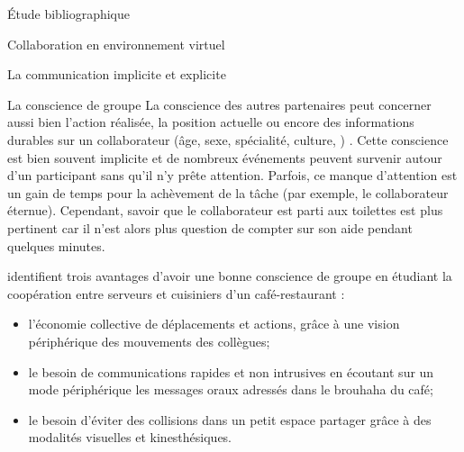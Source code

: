 \documentclass[myfrancais,ngerman,english,frenchb]{mythesis}
\begin{document}
\begin{mychapter}{Étude bibliographique}
\begin{mysection}{Collaboration en environnement virtuel}
\begin{mysubsection}{La communication implicite et explicite}
\begin{mysubsubsection}{La conscience de groupe}
					La conscience des autres partenaires peut concerner aussi bien l'action réalisée, la position actuelle ou encore des informations durables sur un collaborateur (âge, sexe, spécialité, culture, \myetc) .
					Cette conscience est bien souvent implicite et de nombreux événements peuvent survenir autour d'un participant sans qu'il n'y prête attention.
					Parfois, ce manque d'attention est un gain de temps pour la achèvement de la tâche (par exemple, le collaborateur éternue).
					Cependant, savoir que le collaborateur est parti aux toilettes est plus pertinent car il n'est alors plus question de compter sur son aide pendant quelques minutes.

					 identifient trois avantages d'avoir une bonne conscience de groupe en étudiant la coopération entre serveurs et cuisiniers d'un café-restaurant :
					\begin{itemize}
						\item l'économie collective de déplacements et actions, grâce à une vision périphérique des mouvements des collègues;
						\item le besoin de communications rapides et non intrusives en écoutant sur un mode périphérique les messages oraux adressés dans le brouhaha du café;
						\item le besoin d'éviter des collisions dans un petit espace partager grâce à des modalités visuelles et kinesthésiques.
					\end{itemize}


\end{mysubsubsection}
\end{mysubsection}
\end{mysection}
\end{mychapter}
\end{document}
